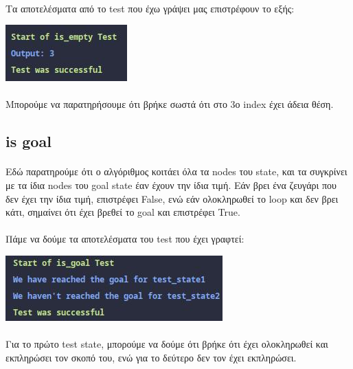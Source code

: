 \documentclass{article}
\begin{document}
    \paragraph{}
    Τα αποτελέσματα από το test που έχω γράψει μας επιστρέφουν το εξής:

    \includegraphics{images/is_empty.jpeg}

    \paragraph{}
    Μπορούμε να παρατηρήσουμε ότι βρήκε σωστά ότι στο 3ο index έχει άδεια θέση.

    \subsection{is goal}

    

    \paragraph{}
    Εδώ παρατηρούμε ότι ο αλγόριθμος κοιτάει όλα τα nodes του state, και τα συγκρίνει με τα ίδια nodes του goal state έαν
    έχουν την ίδια τιμή. Εάν βρει ένα ζευγάρι που δεν έχει την ίδια τιμή, επιστρέφει False, ενώ εάν ολοκληρωθεί το loop και δεν βρει
    κάτι, σημαίνει ότι έχει βρεθεί το goal και επιστρέφει True. 

    \paragraph{}
    Πάμε να δούμε τα αποτελέσματα του test που έχει γραφτεί:

    \includegraphics{images/is_goal.jpeg}

    \paragraph{}
    Για το πρώτο test state, μπορούμε να δούμε ότι βρήκε ότι έχει ολοκληρωθεί και εκπληρώσει τον σκοπό του, ενώ για το δεύτερο δεν τον έχει εκπληρώσει.
\end{document}
